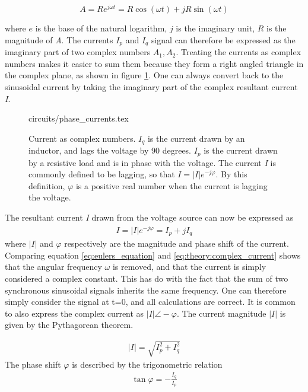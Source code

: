 \documentclass[class=book, crop=false]{standalone}
\begin{document}
\begin{equation}\label{eq:eulers_equation}
    A = Re^{j\omega t} = R\cos{(\omega t)} + jR\sin{(\omega t)}
\end{equation}

where $e$ is the base of the natural logarithm, $j$ is the imaginary unit, $R$ is the magnitude of \textit{A}. The currents $I_{p}$ and $I_{q}$ signal can therefore be expressed as the imaginary part of two complex numbers $A_{1}, A_{2}$. Treating the currents as complex numbers makes it easier to sum them because they form a right angled triangle in the complex plane, as shown in figure \ref{fig:theory:phase_current}. One can always convert back to the sinusoidal current by taking the imaginary part of the complex resultant current \textit{I}.

\begin{figure}[ht!]
    \center
    {circuits/phase_currents.tex}
    \caption[size = 9]
    {Current as complex numbers. $I_{q}$ is the current drawn by an inductor, and lags the voltage by 90 degrees. $I_{p}$ is the current drawn by a resistive load and is in phase with the voltage. The current \textit{I} is commonly defined to be lagging, so that $I = |I|e^{-j\varphi}$. By this definition, $\varphi$ is a positive real number when the current is lagging the voltage.   }\label{fig:theory:phase_current}
\end{figure}

The resultant current \textit{I} drawn from the voltage source can now be expressed as 
\begin{equation}
   \begin{aligned}\label{eq:theory:complex_current}
I = |I|e^{-j \varphi} = I_{p} + jI_{q}
\end{aligned} 
\end{equation}
where $|I|$ and $\varphi$ respectively are the magnitude and phase shift of the current. Comparing equation \eqref{eq:eulers_equation} and \eqref{eq:theory:complex_current} shows that the angular frequency $\omega$ is removed, and that the current is simply considered a complex constant. This has do with the fact that the sum of two synchronous sinusoidal signals inherits the same frequency. One can therefore simply consider the signal at t=0, and all calculations are correct. It is common to also express the complex current as $|I|\angle -\varphi$. The current magnitude $|I|$ is given by the Pythagorean theorem. 

\begin{equation}
   \begin{aligned}\label{eq:theory:pythagoras_current}
|I| = \sqrt{I_{p}^{2} + I_{q}^{2}}
\end{aligned} 
\end{equation}
The phase shift $\varphi$ is described by the trigonometric relation
\begin{equation}
   \begin{aligned}\label{eq:theory:phase_shift_current
   }
   \tan{\varphi} = -\frac{I_{q}}{I_{p}}
\end{aligned} 
\end{equation}
\end{document}
